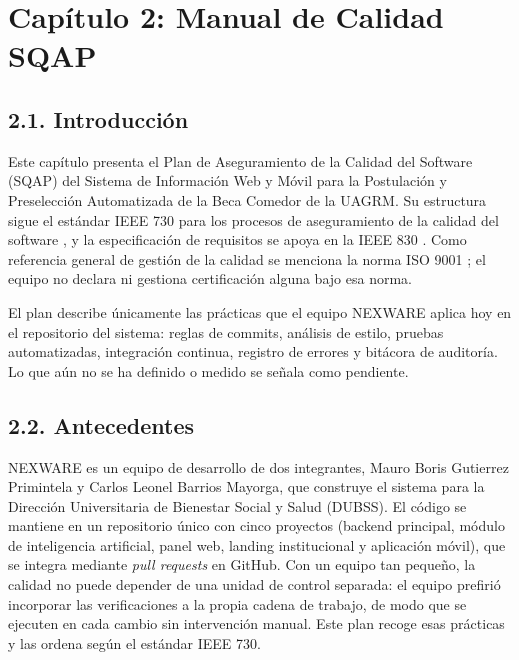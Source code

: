 
\newpage
\section{Capítulo 2: Manual de Calidad SQAP}\label{cap:sqap}


\subsection{2.1. Introducción}

Este capítulo presenta el Plan de Aseguramiento de la Calidad del Software (SQAP) del Sistema de Información Web y Móvil para la Postulación y Preselección Automatizada de la Beca Comedor de la UAGRM. Su estructura sigue el estándar IEEE 730 para los procesos de aseguramiento de la calidad del software \parencite{ieee730_2014}, y la especificación de requisitos se apoya en la IEEE 830 \parencite{ieee830_1998}. Como referencia general de gestión de la calidad se menciona la norma ISO 9001 \parencite{iso9001_2015}; el equipo no declara ni gestiona certificación alguna bajo esa norma.

El plan describe únicamente las prácticas que el equipo NEXWARE aplica hoy en el repositorio del sistema: reglas de commits, análisis de estilo, pruebas automatizadas, integración continua, registro de errores y bitácora de auditoría. Lo que aún no se ha definido o medido se señala como pendiente.

\subsection{2.2. Antecedentes}

NEXWARE es un equipo de desarrollo de dos integrantes, Mauro Boris Gutierrez Primintela y Carlos Leonel Barrios Mayorga, que construye el sistema para la Dirección Universitaria de Bienestar Social y Salud (DUBSS). El código se mantiene en un repositorio único con cinco proyectos (backend principal, módulo de inteligencia artificial, panel web, landing institucional y aplicación móvil), que se integra mediante \textit{pull requests} en GitHub. Con un equipo tan pequeño, la calidad no puede depender de una unidad de control separada: el equipo prefirió incorporar las verificaciones a la propia cadena de trabajo, de modo que se ejecuten en cada cambio sin intervención manual. Este plan recoge esas prácticas y las ordena según el estándar IEEE 730.

